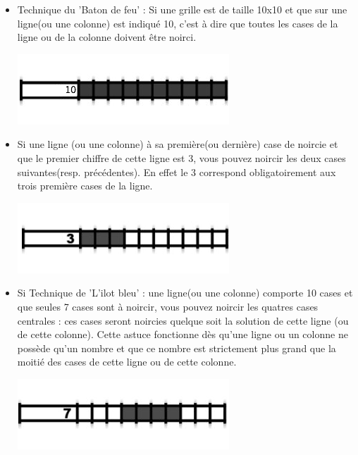 	\begin{itemize}
		\item Technique du 'Baton de feu' : Si une grille est de taille 10x10 et que sur une ligne(ou une colonne) est indiqué 10, c'est à dire que toutes les cases de la ligne ou de la colonne doivent être noirci.\\

	\begin{center}
		\includegraphics{data/manuels/10par10.png}\\
	\end{center}

		\item Si une ligne (ou une colonne) à sa première(ou dernière) case de noircie et que le premier chiffre de cette ligne est 3, vous pouvez noircir les deux cases suivantes(resp. précédentes). En effet le 3 correspond obligatoirement aux trois première cases de la ligne.\\
	\begin{center}
		\includegraphics{data/manuels/3premier.png}\\
	\end{center}
\newpage
		\item Si Technique de 'L'ilot bleu' : une ligne(ou une colonne) comporte 10 cases et que seules 7 cases sont à noircir, vous pouvez noircir les quatres cases centrales : ces cases seront noircies quelque soit la solution de cette ligne (ou de cette colonne). Cette astuce fonctionne dès qu'une ligne ou un colonne ne possède qu'un nombre et que ce nombre est strictement plus grand que la moitié des cases de cette ligne ou de cette colonne.\\

	\begin{center}
		\includegraphics{data/manuels/7casesSur10.png}
	\end{center}
		

\end{itemize}
